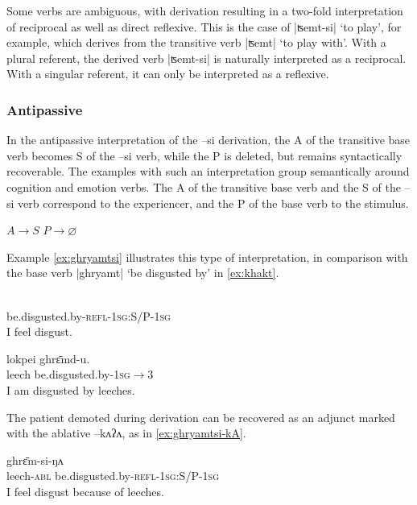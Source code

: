 \documentclass[twoside,a4paper,11pt]{article}
\newcommand{\ipa}[1]{{\phon#1}}
\begin{document}
Some verbs are ambiguous, with derivation resulting in a two-fold interpretation of reciprocal as well as direct reflexive.  This is the case of |\ipa{ʦemt-si}| `to play', for example, which derives from the transitive verb |\ipa{ʦemt}|  `to play with'.  With a plural referent, the derived verb |\ipa{ʦemt-si}| is naturally interpreted as a reciprocal.  With a singular referent, it can only be interpreted as a reflexive.  


\subsubsection{Antipassive}
In the antipassive  interpretation of the \ipa{--si} derivation, the A of the transitive base verb becomes S of the  \ipa{--si} verb, while the P is deleted, but remains syntactically recoverable. The  examples with such an interpretation  group semantically around cognition and emotion verbs. The A of the transitive base verb and the S of the \ipa{--si} verb correspond to the experiencer, and the P of the base verb to the stimulus.

 \begin{exe}
\ex \label{ex:antipass}
\glt $A  \rightarrow S$  
\glt $P \rightarrow \varnothing  $  
\end{exe}

Example \ref{ex:ghryamtsi} illustrates this type of interpretation, in comparison with the base verb |\ipa{ghryamt}| `be disgusted by' in \ref{ex:khakt}.

 \begin{exe}
\ex \label{ex:ghryamtsi} 
\gll \ipa{ghrɛ̄m-si-ŋʌ}\\
 be.disgusted.by-\textsc{refl-1sg:S/P-1sg} \\
\glt  I feel disgust.
\end{exe}

\begin{exe}
\ex \label{ex:ghryamt} 
\gll 
  	\ipa{lokpei}  	\ipa{ghrɛ̄md-u.}  \\
leech  be.disgusted.by-\textsc{1sg$\rightarrow$3} \\
 \glt  I am disgusted by leeches.
\end{exe}

The patient demoted during derivation can be recovered as an adjunct marked with the ablative \ipa{--kʌʔʌ}, as in \ref{ex:ghryamtsi-kA}.

 \begin{exe}
\ex \label{ex:ghryamtsi-kA} 
\gll 	\ipa{lokpei-kʌʔʌ} \ipa{ghrɛ̄m-si-ŋʌ}\\
leech-\textsc{abl} be.disgusted.by-\textsc{refl-1sg:S/P-1sg} \\
 \glt  I feel disgust because of leeches.
\end{exe}
 
\end{document}
